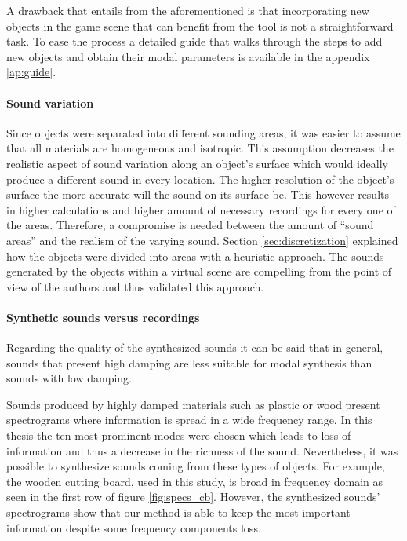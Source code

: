 A drawback that entails from the aforementioned is that incorporating new objects in the game scene that can benefit from the tool is not a straightforward task. To ease the process a detailed guide that walks through the steps to add new objects and obtain their modal parameters is available in the appendix \ref{ap:guide}. 

\paragraph{Sound variation\\}
Since objects were separated into different sounding areas, it was easier to assume that all materials are homogeneous and isotropic. This assumption decreases the realistic aspect of sound variation along an object's surface which would ideally produce a different sound in every location. The higher resolution of the object's surface the more accurate will the sound on its surface be. This however results in higher calculations and higher amount of necessary recordings for every one of the areas. Therefore, a compromise is needed between the amount of ``sound areas'' and the realism of the varying sound. Section \ref{sec:discretization} explained how the objects were divided into areas with a heuristic approach. The sounds generated by the objects within a virtual scene are compelling from the point of view of the authors and thus validated this approach.



\paragraph{Synthetic sounds versus recordings\\}

Regarding the quality of the synthesized sounds it can be said that in general, sounds that present high damping are less suitable for modal synthesis than sounds with low damping. 

Sounds produced by highly damped materials such as plastic or wood present spectrograms where information is spread in a wide frequency range. In this thesis the ten most prominent modes were chosen which leads to loss of information and thus a decrease in the richness of the sound. Nevertheless, it was possible to synthesize sounds coming from these types of objects. For example, the wooden cutting board, used in this study, is broad in frequency domain as seen in the first row of figure \ref{fig:specs_cb}. However, the synthesized sounds' spectrograms show that our method is able to keep the most important information despite some frequency components loss. 


